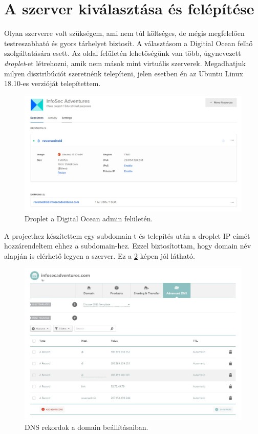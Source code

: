\documentclass{thesis-ekf}
\theoremstyle{definition}
\theoremstyle{remark}
\begin{document}
\section{A szerver kiválasztása és felépítése}

Olyan szerverre volt szükségem, ami nem túl költséges, de mégis megfelelően testreszabható és gyors tárhelyet biztosít.
A választásom a Digitial Ocean felhő szolgáltatására esett. Az oldal felületén lehetőségünk van több, úgynevezett \emph{droplet}-et létrehozni, amik nem mások mint virtuális szerverek. 
Megadhatjuk milyen disztribúciót szeretnénk telepíteni, jelen esetben én az Ubuntu Linux 18.10-es verzióját telepítettem.

\begin{figure}[!h]
	\centering
	\includegraphics[width=15cm]{kepek/digitalocean}
	\caption{Droplet a Digital Ocean admin felületén.}
	\label{digitalocean}
\end{figure}

A projecthez készítettem egy subdomain-t és telepítés után a droplet IP címét hozzárendeltem ehhez a subdomain-hez.
Ezzel biztosítottam, hogy domain név alapján is elérhető legyen a szerver. Ez a \ref{namecheap} képen jól látható.

\begin{figure}[!h]
	\centering
	\includegraphics[width=15cm]{kepek/namecheap}
	\caption{DNS rekordok a domain beállításaiban.}
	\label{namecheap}
\end{figure}
\end{document}

